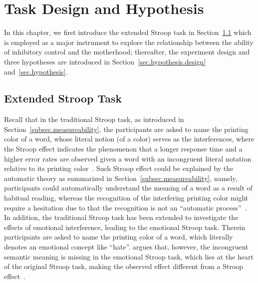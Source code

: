 \chapter{Task Design and Hypothesis}
\label{chp.hypothesis}


In this chapter, we first introduce the extended Stroop task in Section~\ref{sec.hypothesis.expstrooptask} 
which is employed as a major 
instrument to explore the relationship between the ability of inhibitory control and the motherhood;
thereafter, the experiment design and three hypotheses are introduced in Section~\ref{sec.hypothesis.design} and~\ref{sec.hypothesis}.

\section{Extended Stroop Task}\label{sec.hypothesis.expstrooptask}
Recall that in the traditional Stroop task, 
as introduced in Section~\ref{subsec.measureability},
the participants are asked to name the printing color
of a word, whose literal notion (of a color)
serves as the interferences, where the Stroop effect indicates the phenomenon that a longer response time and a higher error rates are observed 
given a word with an incongruent literal notation
relative to its printing color~\citep{stroop1935studies}.
Such Stroop effect could be explained by the automatic theory as summarized in Section~\ref{subsec.measureability}, namely,
participants could automatically understand
the meaning of a word as a result of habitual reading,
whereas 
the recognition of the interfering printing color
might require a hesitation due to that the recognition 
 is not an ``automatic process''~\citep{monahan2001coloring}. 
In addition,
the traditional Stroop task has been extended 
to investigate the effects of emotional interference,
leading to the emotional Stroop task. 
Therein 
participants are asked to name the printing color of a word,
which literally denotes an emotional concept like ``hate''.
\citeauthor{algom2004rational}
argues that, however, the incongruent semantic meaning is 
missing in the emotional Stroop task, which lies at the heart of the 
original Stroop task,
making the observed effect different from a Stroop effect~\citep{algom2004rational}.


